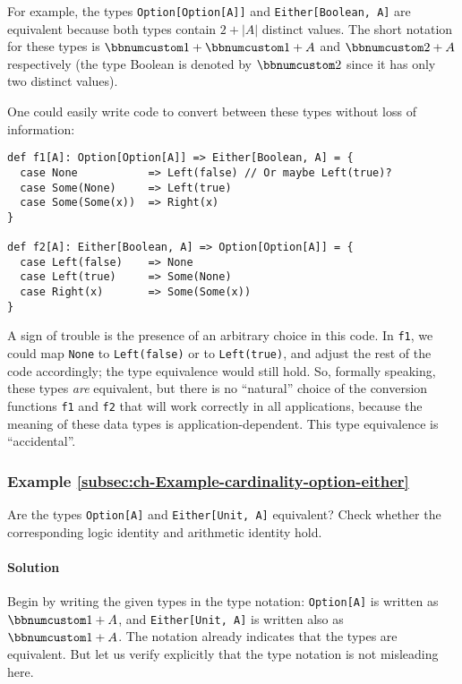 For example, the types \lstinline!Option[Option[A]]! and \lstinline!Either[Boolean, A]!
are equivalent because both types contain $2+\left|A\right|$ distinct
values. The short notation for these types is $\bbnum 1+\bbnum 1+A$
and $\bbnum 2+A$ respectively (the type Boolean is denoted by $\bbnum 2$
since it has only two distinct values). 

One could easily write code to convert between these types without
loss of information:
\begin{lstlisting}
def f1[A]: Option[Option[A]] => Either[Boolean, A] = {
  case None           => Left(false) // Or maybe Left(true)?
  case Some(None)     => Left(true)
  case Some(Some(x))  => Right(x)
}

def f2[A]: Either[Boolean, A] => Option[Option[A]] = {
  case Left(false)    => None
  case Left(true)     => Some(None)
  case Right(x)       => Some(Some(x))
}
\end{lstlisting}
A sign of trouble is the presence of an arbitrary choice in this code.
In \lstinline!f1!, we could map \lstinline!None! to \lstinline!Left(false)!
or to \lstinline!Left(true)!, and adjust the rest of the code accordingly;
the type equivalence would still hold. So, formally speaking, these
types \emph{are} equivalent, but there is no \textsf{``}natural\textsf{''} choice
of the conversion functions \lstinline!f1! and \lstinline!f2! that
will work correctly in all applications, because the meaning of these
data types is application-dependent. This type equivalence is \textsf{``}accidental\textsf{''}.

\subsubsection{Example \label{subsec:ch-Example-cardinality-option-either}\ref{subsec:ch-Example-cardinality-option-either}}

Are the types \lstinline!Option[A]! and \lstinline!Either[Unit, A]!
equivalent? Check whether the corresponding logic identity and arithmetic
identity hold.

\paragraph{Solution}

Begin by writing the given types in the type notation: \lstinline!Option[A]!
is written as $\bbnum 1+A$, and \lstinline!Either[Unit, A]! is written
also as $\bbnum 1+A$. The notation already indicates that the types
are equivalent. But let us verify explicitly that the type notation
is not misleading here.

